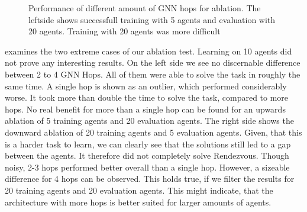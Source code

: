 \begin{figure}[htp]
    \centering
    \hspace{1cm}                       
    \caption{Performance of different amount of GNN hops for ablation. The leftside shows successfull training with 5 agents and evaluation with 20 agents. Training with 20 agents was more difficult}
    \label{fig:ablation-5-20-20-5}
\end{figure}

 examines the two extreme cases of our ablation test. Learning on 10 agents did not prove any interesting results. On the left side we see no discernable difference between 2 to 4 GNN Hops. All of them were able to solve the task in roughly the same time. A single hop is shown as an outlier, which performed considerably worse. It took more than double the time to solve the task, compared to more hops. No real benefit for more than a single hop can be found for an upwards ablation of 5 training agents and 20 evaluation agents. The right side shows the downward ablation of 20 training agents and 5 evaluation agents. Given, that this is a harder task to learn, we can clearly see that the solutions still led to a gap between the agents. It therefore did not completely solve Rendezvous. Though noisy, 2-3 hops performed better overall than a single hop. However, a sizeable difference for 4 hops can be observed. This holds true, if we filter the results for 20 training agents and 20 evaluation agents. This might indicate, that the architecture with more hops is better suited for larger amounts of agents. 

